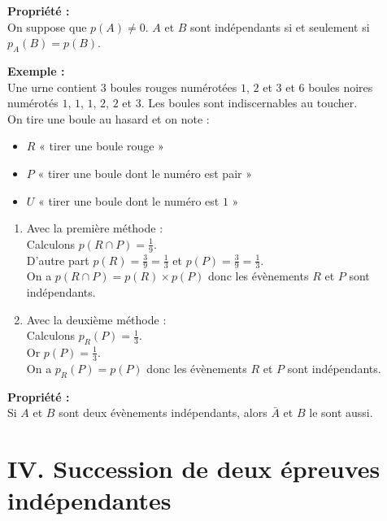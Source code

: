 \documentclass[11pt,a4paper]{article}
\begin{document}
\begin{mdframed}[style=proprieteStyle]
  \textbf{Propriété :} ~\\
  On suppose que $p(A)\not=0$. $A$ et $B$ sont indépendants si et seulement si $p_A(B)=p(B)$.
\end{mdframed}

\textbf{Exemple :} ~\\
Une urne contient $3$ boules rouges numérotées $1$, $2$ et $3$ et $6$ boules noires numérotés $1$, $1$, $1$, $2$, $2$ et $3$. Les boules sont indiscernables au toucher. \\

On tire une boule au hasard et on note :
\vspace{-6pt}
\begin{itemize}
  \item $R$ « tirer une boule rouge »
  \item $P$ « tirer une boule dont le numéro est pair »
  \item $U$ « tirer une boule dont le numéro est $1$ »
\end{itemize}

\begin{enumerate}
  \item Avec la première méthode : \\
  Calculons $p(R\cap P)=\frac{1}{9}$.\\
  D'autre part $p(R)=\frac{3}{9}=\frac{1}{3}$ et $p(P)=\frac{3}{9}=\frac{1}{3}$. \\
  On a $p(R\cap P)=p(R)\times p(P)$ donc les évènements $R$ et $P$ sont indépendants.
  \item Avec la deuxième méthode : \\
  Calculons $p_R(P)=\frac{1}{3}$.\\
  Or $p(P)=\frac{1}{3}$. \\
  On a $p_R(P)=p(P)$ donc les évènements $R$ et $P$ sont indépendants.
\end{enumerate}

\begin{mdframed}[style=proprieteStyle]
  \textbf{Propriété :} ~\\
  Si $A$ et $B$ sont deux évènements indépendants, alors $\bar A$ et $B$ le sont aussi.
\end{mdframed}

\section*{IV. Succession de deux épreuves indépendantes}
\end{document}
